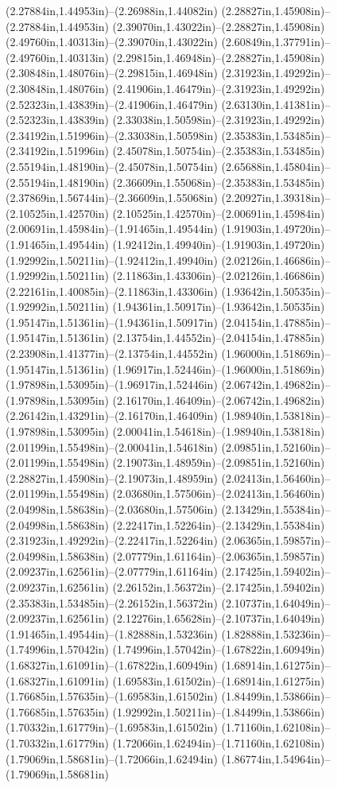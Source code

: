 (2.27884in,1.44953in)--(2.26988in,1.44082in) (2.28827in,1.45908in)--(2.27884in,1.44953in) (2.39070in,1.43022in)--(2.28827in,1.45908in) (2.49760in,1.40313in)--(2.39070in,1.43022in) (2.60849in,1.37791in)--(2.49760in,1.40313in) (2.29815in,1.46948in)--(2.28827in,1.45908in) (2.30848in,1.48076in)--(2.29815in,1.46948in) (2.31923in,1.49292in)--(2.30848in,1.48076in) (2.41906in,1.46479in)--(2.31923in,1.49292in) (2.52323in,1.43839in)--(2.41906in,1.46479in) (2.63130in,1.41381in)--(2.52323in,1.43839in) (2.33038in,1.50598in)--(2.31923in,1.49292in) (2.34192in,1.51996in)--(2.33038in,1.50598in) (2.35383in,1.53485in)--(2.34192in,1.51996in) (2.45078in,1.50754in)--(2.35383in,1.53485in) (2.55194in,1.48190in)--(2.45078in,1.50754in) (2.65688in,1.45804in)--(2.55194in,1.48190in) (2.36609in,1.55068in)--(2.35383in,1.53485in) (2.37869in,1.56744in)--(2.36609in,1.55068in) (2.20927in,1.39318in)--(2.10525in,1.42570in) (2.10525in,1.42570in)--(2.00691in,1.45984in) (2.00691in,1.45984in)--(1.91465in,1.49544in) (1.91903in,1.49720in)--(1.91465in,1.49544in) (1.92412in,1.49940in)--(1.91903in,1.49720in) (1.92992in,1.50211in)--(1.92412in,1.49940in) (2.02126in,1.46686in)--(1.92992in,1.50211in) (2.11863in,1.43306in)--(2.02126in,1.46686in) (2.22161in,1.40085in)--(2.11863in,1.43306in) (1.93642in,1.50535in)--(1.92992in,1.50211in) (1.94361in,1.50917in)--(1.93642in,1.50535in) (1.95147in,1.51361in)--(1.94361in,1.50917in) (2.04154in,1.47885in)--(1.95147in,1.51361in) (2.13754in,1.44552in)--(2.04154in,1.47885in) (2.23908in,1.41377in)--(2.13754in,1.44552in) (1.96000in,1.51869in)--(1.95147in,1.51361in) (1.96917in,1.52446in)--(1.96000in,1.51869in) (1.97898in,1.53095in)--(1.96917in,1.52446in) (2.06742in,1.49682in)--(1.97898in,1.53095in) (2.16170in,1.46409in)--(2.06742in,1.49682in) (2.26142in,1.43291in)--(2.16170in,1.46409in) (1.98940in,1.53818in)--(1.97898in,1.53095in) (2.00041in,1.54618in)--(1.98940in,1.53818in) (2.01199in,1.55498in)--(2.00041in,1.54618in) (2.09851in,1.52160in)--(2.01199in,1.55498in) (2.19073in,1.48959in)--(2.09851in,1.52160in) (2.28827in,1.45908in)--(2.19073in,1.48959in) (2.02413in,1.56460in)--(2.01199in,1.55498in) (2.03680in,1.57506in)--(2.02413in,1.56460in) (2.04998in,1.58638in)--(2.03680in,1.57506in) (2.13429in,1.55384in)--(2.04998in,1.58638in) (2.22417in,1.52264in)--(2.13429in,1.55384in) (2.31923in,1.49292in)--(2.22417in,1.52264in) (2.06365in,1.59857in)--(2.04998in,1.58638in) (2.07779in,1.61164in)--(2.06365in,1.59857in) (2.09237in,1.62561in)--(2.07779in,1.61164in) (2.17425in,1.59402in)--(2.09237in,1.62561in) (2.26152in,1.56372in)--(2.17425in,1.59402in) (2.35383in,1.53485in)--(2.26152in,1.56372in) (2.10737in,1.64049in)--(2.09237in,1.62561in) (2.12276in,1.65628in)--(2.10737in,1.64049in) (1.91465in,1.49544in)--(1.82888in,1.53236in) (1.82888in,1.53236in)--(1.74996in,1.57042in) (1.74996in,1.57042in)--(1.67822in,1.60949in) (1.68327in,1.61091in)--(1.67822in,1.60949in) (1.68914in,1.61275in)--(1.68327in,1.61091in) (1.69583in,1.61502in)--(1.68914in,1.61275in) (1.76685in,1.57635in)--(1.69583in,1.61502in) (1.84499in,1.53866in)--(1.76685in,1.57635in) (1.92992in,1.50211in)--(1.84499in,1.53866in) (1.70332in,1.61779in)--(1.69583in,1.61502in) (1.71160in,1.62108in)--(1.70332in,1.61779in) (1.72066in,1.62494in)--(1.71160in,1.62108in) (1.79069in,1.58681in)--(1.72066in,1.62494in) (1.86774in,1.54964in)--(1.79069in,1.58681in) 